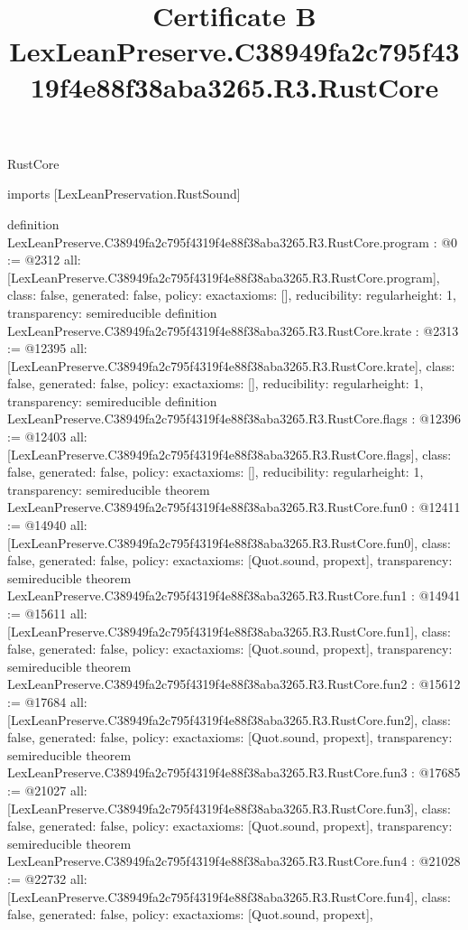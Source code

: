 \begin{lexlean}{RustCore}
\title{Certificate B LexLeanPreserve.C38949fa2c795f4319f4e88f38aba3265.R3.RustCore}
\begin{coremodule}
imports [LexLeanPreservation.RustSound]

definition LexLeanPreserve.C38949fa2c795f4319f4e88f38aba3265.R3.RustCore.program : @0 := @2312 {
  all: [LexLeanPreserve.C38949fa2c795f4319f4e88f38aba3265.R3.RustCore.program],
  class: false,
  generated: false,
  policy: exact{axioms: []},
  reducibility: regular{height: 1},
  transparency: semireducible
}
definition LexLeanPreserve.C38949fa2c795f4319f4e88f38aba3265.R3.RustCore.krate : @2313 := @12395 {
  all: [LexLeanPreserve.C38949fa2c795f4319f4e88f38aba3265.R3.RustCore.krate],
  class: false,
  generated: false,
  policy: exact{axioms: []},
  reducibility: regular{height: 1},
  transparency: semireducible
}
definition LexLeanPreserve.C38949fa2c795f4319f4e88f38aba3265.R3.RustCore.flags : @12396 := @12403 {
  all: [LexLeanPreserve.C38949fa2c795f4319f4e88f38aba3265.R3.RustCore.flags],
  class: false,
  generated: false,
  policy: exact{axioms: []},
  reducibility: regular{height: 1},
  transparency: semireducible
}
theorem LexLeanPreserve.C38949fa2c795f4319f4e88f38aba3265.R3.RustCore.fun0 : @12411 := @14940 {
  all: [LexLeanPreserve.C38949fa2c795f4319f4e88f38aba3265.R3.RustCore.fun0],
  class: false,
  generated: false,
  policy: exact{axioms: [Quot.sound, propext]},
  transparency: semireducible
}
theorem LexLeanPreserve.C38949fa2c795f4319f4e88f38aba3265.R3.RustCore.fun1 : @14941 := @15611 {
  all: [LexLeanPreserve.C38949fa2c795f4319f4e88f38aba3265.R3.RustCore.fun1],
  class: false,
  generated: false,
  policy: exact{axioms: [Quot.sound, propext]},
  transparency: semireducible
}
theorem LexLeanPreserve.C38949fa2c795f4319f4e88f38aba3265.R3.RustCore.fun2 : @15612 := @17684 {
  all: [LexLeanPreserve.C38949fa2c795f4319f4e88f38aba3265.R3.RustCore.fun2],
  class: false,
  generated: false,
  policy: exact{axioms: [Quot.sound, propext]},
  transparency: semireducible
}
theorem LexLeanPreserve.C38949fa2c795f4319f4e88f38aba3265.R3.RustCore.fun3 : @17685 := @21027 {
  all: [LexLeanPreserve.C38949fa2c795f4319f4e88f38aba3265.R3.RustCore.fun3],
  class: false,
  generated: false,
  policy: exact{axioms: [Quot.sound, propext]},
  transparency: semireducible
}
theorem LexLeanPreserve.C38949fa2c795f4319f4e88f38aba3265.R3.RustCore.fun4 : @21028 := @22732 {
  all: [LexLeanPreserve.C38949fa2c795f4319f4e88f38aba3265.R3.RustCore.fun4],
  class: false,
  generated: false,
  policy: exact{axioms: [Quot.sound, propext]},
}
\end{coremodule}
\end{lexlean}
